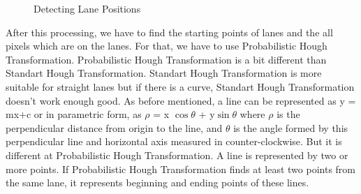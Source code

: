 \begin{figure}[H]
  \centering
  \hfill
  \hfill
  \caption{Detecting Lane Positions}
\end{figure}

After this processing, we have to find the starting points of lanes and the all pixels which are on the lanes. For that, we have to use Probabilistic Hough Transformation. Probabilistic Hough Transformation is a bit different than Standart Hough Transformation. Standart Hough Transformation is more suitable for straight lanes but if there is a curve, Standart Hough Transformation doesn't work enough good. As before mentioned, a line can be represented as y = mx+c or in parametric form, as $\rho$ = x $\cos \theta$ + y$ \sin \theta$ where  $\rho$ is the perpendicular distance from origin to the line, and $\theta$ is the angle formed by this perpendicular line and horizontal axis measured in counter-clockwise. But it is different at Probabilistic Hough Transformation. A line is represented by two or more points. If Probabilistic Hough Transformation finds at least two points from the same lane, it represents beginning and ending points of these lines.

